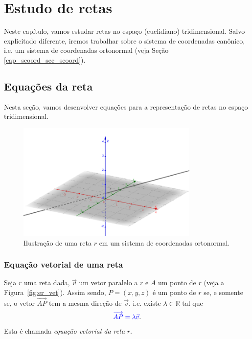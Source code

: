 
\chapter{Estudo de retas}\label{cap_er}
\thispagestyle{fancy}

Neste capítulo, vamos estudar retas no espaço (euclidiano) tridimensional. Salvo explicitado diferente, iremos trabalhar sobre o sistema de coordenadas canônico, i.e. um sistema de coordenadas ortonormal (veja Seção \ref{cap_scoord_sec_scoord}).

\section{Equações da reta}\label{cap_ert_sec_eqsreta}

Nesta seção, vamos desenvolver equações para a representação de retas no espaço tridimensional.

\begin{figure}[H]
  \centering
  \includegraphics[width=0.8\textwidth]{cap_er/dados/fig_er_ilu0/fig}
  \caption{Ilustração de uma reta $r$ em um sistema de coordenadas ortonormal.}
\end{figure}

\subsection{Equação vetorial de uma reta}

Seja $r$ uma reta dada, $\vec{v}$ um vetor paralelo a $r$ e $A$ um ponto de $r$ (veja a Figura~\ref{fig:er_vet}). Assim sendo, $P=(x,y,z)$ é um ponto de $r$ se, e somente se, o vetor $\overrightarrow{AP}$ tem a mesma direção de $\vec{v}$. i.e. existe $\lambda\in\mathbb{R}$ tal que
\begin{equation}
  {\color{blue}\overrightarrow{AP} = \lambda\vec{v}}.
\end{equation}
Esta é chamada \emph{equação vetorial da reta} $r$.


